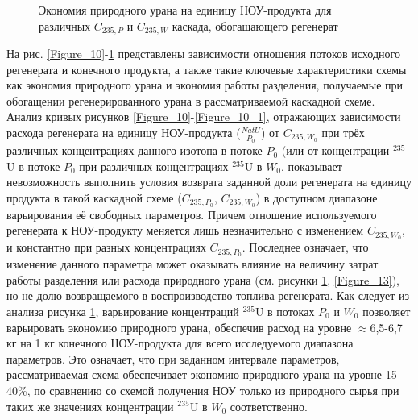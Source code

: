 \begin{figure}[ht]
  \caption{Экономия природного урана на единицу НОУ-продукта  для различных $C_{235, P}$ и $C_{235, W}$ каскада, обогащающего регенерат}\label{fig:sc2_2}
\end{figure}

На рис. \ref{Figure_10}-\ref{fig:sc2_2} представлены зависимости отношения потоков исходного регенерата и конечного продукта, а также такие ключевые характеристики схемы как экономия природного урана и экономия работы разделения, получаемые при обогащении регенерированного урана в рассматриваемой каскадной схеме. 
Анализ кривых рисунков \ref{Figure_10}-\ref{Figure_10_1}, отражающих зависимости расхода регенерата на единицу НОУ-продукта ($\frac{NatU}{P_{0}}$) от $C_{235, W_0}$ при трёх различных концентрациях данного изотопа в потоке $P_0$ (или от концентрации $^{235}$U в потоке $P_0$ при различных концентрациях $^{235}$U в $W_0$, показывает невозможность выполнить условия возврата заданной доли регенерата на единицу продукта в такой каскадной схеме ($C_{235, P_0}$, $C_{235, W_0}$) в доступном диапазоне варьирования её свободных параметров. Причем отношение используемого регенерата к НОУ-продукту меняется лишь незначительно с изменением $C_{235, W_0}$, и константно при разных концентрациях $C_{235, P_0}$. Последнее означает, что изменение данного параметра может оказывать влияние на величину затрат работы разделения или расхода природного урана (см. рисунки \ref{fig:sc2_2}, \ref{Figure_13}), но не долю возвращаемого в воспроизводство топлива регенерата.
Как следует из анализа рисунка \ref{fig:sc2_2}, варьирование концентраций $^{235}$U в потоках $P_0$ и $W_0$ позволяет варьировать экономию природного урана, обеспечив расход на уровне $\approx$6,5-6,7 кг на 1 кг конечного НОУ-продукта для всего исследуемого диапазона параметров. Это означает, что при заданном интервале параметров, рассматриваемая схема обеспечивает экономию природного урана на уровне 15--40\%, по сравнению со схемой получения НОУ только из природного сырья при таких же значениях концентрации $^{235}$U в $W_0$ соответственно.

